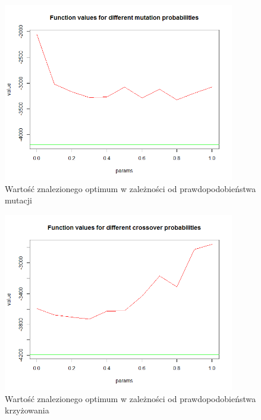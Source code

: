 \documentclass[11pt, a4paper]{article}
\begin{document}
\begin{figure}[H]
	\begin{center}
		\includegraphics[width=0.9\textwidth]{./assets/Schwefel2.png} %
		\caption{Wartość znalezionego optimum w zależności od prawdopodobieństwa mutacji}
		\label{fig:gulf7}
	\end{center}
\end{figure}
\begin{figure}[H]
	\begin{center}
		\includegraphics[width=0.9\textwidth]{./assets/Schwefel3.png} %
		\caption{Wartość znalezionego optimum w zależności od prawdopodobieństwa krzyżowania}
		\label{fig:gulf7}
	\end{center}
\end{figure}
\end{document}
